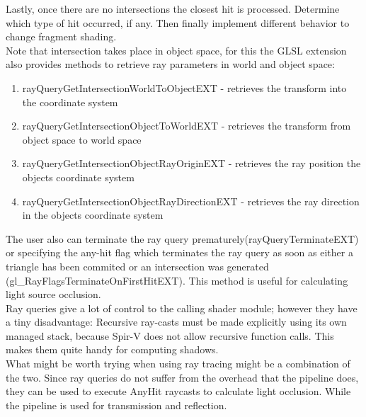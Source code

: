 Lastly, once there are no intersections the closest hit is processed. Determine which type of hit occurred, if any. Then finally implement different behavior to change fragment shading.\\
Note that intersection takes place in object space, for this the GLSL extension also provides methods to retrieve ray parameters in world and object space:
\begin{enumerate}
    \item rayQueryGetIntersectionWorldToObjectEXT - retrieves the transform into the coordinate system
    \item rayQueryGetIntersectionObjectToWorldEXT - retrieves the transform from object space to world space
    \item rayQueryGetIntersectionObjectRayOriginEXT - retrieves the ray position the objects coordinate system
    \item rayQueryGetIntersectionObjectRayDirectionEXT - retrieves the ray direction in the objects coordinate system
\end{enumerate}
The user also can terminate the ray query prematurely(rayQueryTerminateEXT) or specifying the any-hit flag which terminates the ray query as soon as either a triangle has been commited or an intersection was generated (gl\_RayFlagsTerminateOnFirstHitEXT). This method is useful for calculating light source occlusion.\\
Ray queries give a lot of control to the calling shader module; however they have a tiny disadvantage: Recursive ray-casts must be made explicitly using its own managed stack, because Spir-V does not allow recursive function calls. This makes them quite handy for computing shadows.\\
What might be worth trying when using ray tracing might be a combination of the two. Since ray queries do not suffer from the overhead that the pipeline does, they can be used to execute AnyHit raycasts to calculate light occlusion. While the pipeline is used for transmission and reflection.

